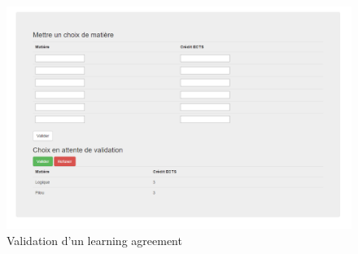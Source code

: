 \begin{figure}[H]
	\centering
	\includegraphics[scale=0.35]{images/lav.png}
	\caption{Validation d'un learning agreement}
	\label{lav}
\end{figure}


